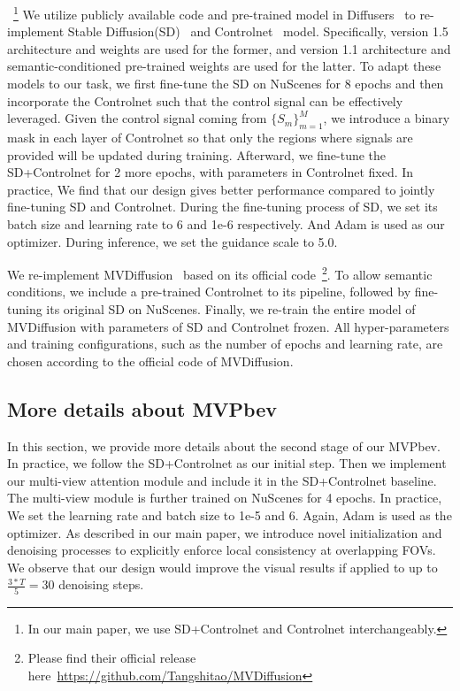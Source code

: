 \documentclass[sigconf]{acmart}
\begin{document}
~\footnote{In our main paper, we use SD+Controlnet and Controlnet interchangeably.} We utilize publicly available code and pre-trained model in Diffusers~\cite{von-platen-etal-2022-diffusers} to re-implement Stable Diffusion(SD)~\cite{rombach2021highresolution} and Controlnet~\cite{zhang2023adding} model. Specifically, version 1.5 architecture and weights are used for the former, and version 1.1 architecture and semantic-conditioned pre-trained weights are used for the latter. To adapt these models to our task, we first fine-tune the SD on NuScenes for 8 epochs and then incorporate the Controlnet such that the control signal can be effectively leveraged. Given the control signal coming from $\{S_m\}_{m=1}^M$, we introduce a binary mask in each layer of Controlnet so that only the regions where signals are provided will be updated during training. Afterward, we fine-tune the SD+Controlnet for 2 more epochs, with parameters in Controlnet fixed. In practice, We find that our design gives better performance compared to jointly fine-tuning SD and Controlnet. During the fine-tuning process of SD, we set its batch size and learning rate to 6 and 1e-6 respectively. And Adam\cite{kingma2014adam} is used as our optimizer. During inference, we set the guidance scale to 5.0.
    
 We re-implement MVDiffusion~\cite{Tang2023mvdiffusion} based on its official code~\footnote{Please find their official release here~\url{https://github.com/Tangshitao/MVDiffusion}}. To allow semantic conditions, we include a pre-trained Controlnet to its pipeline, followed by fine-tuning its original SD on NuScenes. Finally, we re-train the entire model of MVDiffusion with parameters of SD and Controlnet frozen. All hyper-parameters and training configurations, such as the number of epochs and learning rate, are chosen according to the official code of MVDiffusion.


\subsection{More details about MVPbev}
In this section, we provide more details about the second stage of our MVPbev. In practice, we follow the SD+Controlnet as our initial step. Then we implement our multi-view attention module and include it in the SD+Controlnet baseline. The multi-view module is further trained on NuScenes for 4 epochs. In practice, We set the learning rate and batch size to 1e-5 and 6. Again, Adam is used as the optimizer. As described in our main paper, we introduce novel initialization and denoising processes to explicitly enforce local consistency at overlapping FOVs. We observe that our design would improve the visual results if applied to up to $\frac{3*T}{5}=30$ denoising steps.
\end{document}
